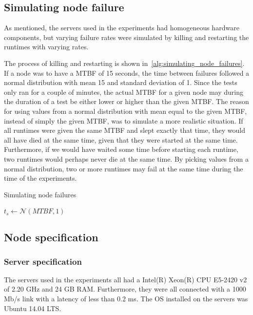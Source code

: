 \documentclass{cslthse-msc}
\begin{document}
\subsection{Simulating node failure} \label{sec:simulating_node_failure}
As mentioned, the servers used in the experiments had homogeneous hardware components, but varying failure rates were simulated by killing and restarting the runtimes with varying rates.

The process of killing and restarting is shown in~\cref{alg:simulating_node_failures}. If a node was to have a MTBF of 15 seconds, the time between failures followed a normal distribution with mean 15 and standard deviation of 1. Since the tests only ran for a couple of minutes, the actual MTBF for a given node may during the duration of a test be either lower or higher than the given MTBF. The reason for using values from a normal distribution with mean equal to the given MTBF, instead of simply the given MTBF, was to simulate a more realistic situation. If all runtimes were given the same MTBF and slept exactly that time, they would all have died at the same time, given that they were started at the same time. Furthermore, if we would have waited some time before starting each runtime, two runtimes would perhaps never die at the same time. By picking values from a normal distribution, two or more runtimes may fail at the same time during the time of the experiments.

\begin{algorithm} 
	\caption{Simulating node failures} \label{alg:simulating_node_failures}
	\begin{algorithmic}[1]
		\State
		\State $t_{s}\gets \mathcal{N} (MTBF,1)$
		\State
		\State
	\EndWhile
	\end{algorithmic}
\end{algorithm}

\subsection{Node specification}
\subsubsection{Server specification} \label{sec:server_spec}
The servers used in the experiments all had a Intel(R) Xeon(R) CPU E5-2420 v2 of 2.20 GHz and 24 GB RAM. Furthermore, they were all connected with a 1000 Mb/s link with a latency of less than 0.2 ms. The OS installed on the servers was Ubuntu 14.04 LTS.
\end{document}
